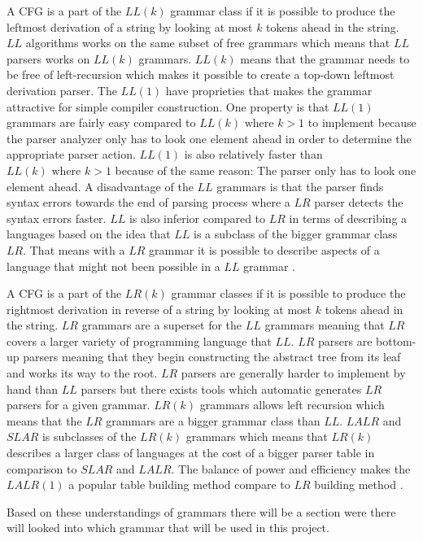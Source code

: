 A CFG is a part of the $LL(k)$ grammar class if it is possible to produce the leftmost derivation of a string by looking at most $k$ tokens ahead in the string. $LL$ algorithms works on the same subset of free grammars which means that $LL$ parsers works on $LL(k)$ grammars. $LL(k)$ means that the grammar needs to be free of left-recursion which makes it possible to create a top-down leftmost derivation parser.
The $LL(1)$ have proprieties that makes the grammar attractive for simple compiler construction. One property is that $LL(1)$ grammars are fairly easy compared to $LL(k)\text{ where }k > 1$ to implement because the parser analyzer only has to look one element ahead in order to determine the appropriate parser action. $LL(1)$ is also relatively faster than $LL(k)\text{ where }k > 1$ because of the same reason: The parser only has to look one element ahead. A disadvantage of the $LL$ grammars is that the parser finds syntax errors towards the end of parsing process where a $LR$ parser detects the syntax errors faster. $LL$ is also inferior compared to $LR$ in terms of describing a languages based on the idea that $LL$ is a subclass of the bigger grammar class $LR$. That means with a $LR$ grammar it is possible to describe aspects of a language that might not been possible in a $LL$ grammar \citep{CraftingACompiler} \citep{sebesta}.

A CFG is a part of the $LR(k)$ grammar classes if it is possible to produce the rightmost derivation in reverse of a string by looking at most $k$ tokens ahead in the string. $LR$ grammars are a superset for the $LL$ grammars meaning that $LR$ covers a larger variety of programming language that $LL$. $LR$ parsers are bottom-up parsers meaning that they begin constructing the abstract tree from its leaf and works its way to the root. $LR$ parsers are generally harder to implement by hand than $LL$ parsers but there exists tools which automatic generates $LR$ parsers for a given grammar. $LR(k)$ grammars allows left recursion which means that the $LR$ grammars are a bigger grammar class than $LL$. $LALR$ and $SLAR$ is subclasses of the $LR(k)$ grammars which means that $LR(k)$ describes a larger class of languages at the cost of a bigger parser table in comparison to $SLAR$ and $LALR$. The balance of power and efficiency makes the $LALR(1)$ a popular table building method compare to $LR$ building method \citep{CraftingACompiler} \citep{sebesta}.

Based on these understandings of grammars there will be a section were there will looked into which grammar that will be used in this project.